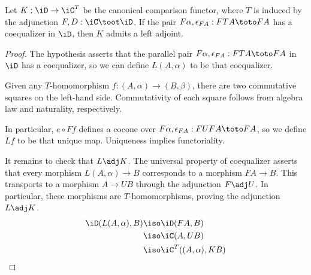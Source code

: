 \documentclass{amsart}
\begin{document}
\begin{lem}
  Let $K : \iD \to \iC^{T}$ be the canonical comparison functor, where $T$ is induced by the adjunction $F,D : \iC \toot \iD$.
  If the pair $F\alpha,\epsilon_{FA} : FTA \toto FA$ has a coequalizer in $\iD$, then $K$ admits a left adjoint.
\end{lem}
\begin{proof}
  The hypothesis asserts that the parallel pair $F\alpha,\epsilon_{FA} : FTA \toto FA$ in $\iD$ has a coequalizer, so we can define $L(A,\alpha)$ to be that coequalizer.
  
  Given any $T$-homomorphism $f : (A,\alpha) \to (B,\beta)$, there are two commutative squares on the left-hand side.
  Commutativity of each square follows from algebra law and naturality, respectively.
  
  In particular, $e \circ Ff$ defines a cocone over $F\alpha,\epsilon_{FA} : FUFA \toto FA$, so we define $Lf$ to be that unique map.
  Uniqueness implies functoriality.

  It remains to check that $L \adj K$.
  The universal property of coequalizer asserts that every morphism $L(A,\alpha) \to B$ corresponds to a morphism $FA \to B$.
  This transports to a morphism $A \to UB$ through the adjunction $F \adj U$.
  In particular, these morphisms are $T$-homomorphisms, proving the adjunction $L \adj K$.
  \begin{align}
    \iD(L(A,\alpha),B) &\iso \iD(FA,B)\\
                  &\iso \iC(A,UB)\\
                  &\iso \iC^{T}((A,\alpha),KB)
  \end{align}
\end{proof}
\end{document}
